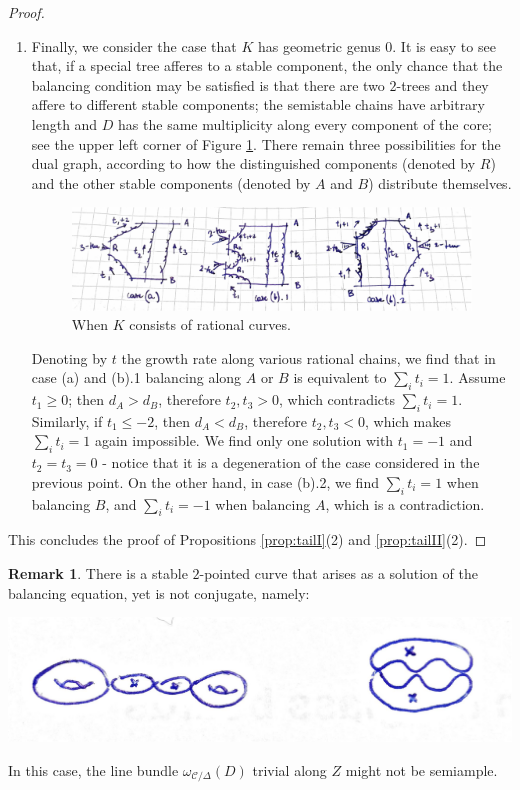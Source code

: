 \documentclass[11pt]{amsart}
\newcommand{\dvr}{\Delta}
\theoremstyle{plain}
\theoremstyle{definition}
\newtheorem{rem}[thm]{Remark}
\begin{document}
\begin{proof}
\begin{enumerate}[leftmargin=.6cm]
 \item Finally, we consider the case that $K$ has geometric genus $0$. It is easy to see that, if a special tree afferes to a stable component, the only chance that the balancing condition may be satisfied is that there are two $2$-trees and they affere to different stable components; the semistable chains have arbitrary length and $D$ has the same multiplicity along every component of the core; see the upper left corner of Figure \ref{fig:Krat}. There remain three possibilities for the dual graph, according to how the distinguished components (denoted by $R$) and the other stable components (denoted by $A$ and $B$) distribute themselves.
  \begin{figure}
 \includegraphics[width=.8\textwidth]{rational_pretzel} 
 \caption{When $K$ consists of rational curves.}\label{fig:Krat}
  \end{figure}
 Denoting by $t$ the growth rate along various rational chains, we find that in case (a) and (b).1 balancing along $A$ or $B$ is equivalent to $\sum_it_i=1$. Assume $t_1\geq0$; then $d_A>d_B$, therefore $t_2,t_3>0$, which contradicts $\sum_it_i=1$. Similarly, if $t_1\leq -2$, then $d_A<d_B$, therefore $t_2,t_3<0$, which makes $\sum_it_i=1$ again impossible. We find only one solution with $t_1=-1$ and $t_2=t_3=0$ - notice that it is a degeneration of the case considered in the previous point.
 On the other hand, in case (b).2, we find $\sum_it_i=1$ when balancing $B$, and $\sum_it_i=-1$ when balancing $A$, which is a contradiction.
\end{enumerate}
This concludes the proof of Propositions \ref{prop:tailI}(2) and \ref{prop:tailII}(2).
\end{proof}
\begin{rem}\label{rmk:extra_conjugate}
There is a stable $2$-pointed curve that arises as a solution of the balancing equation, yet is not conjugate, namely:
  \begin{center}
 \includegraphics[width=.6\textwidth]{extra_conjugate}  
  \end{center}
In this case, the line bundle $\omega_{\mathcal C/\dvr}(D)$ trivial along $Z$ might not be semiample.
\end{rem}
\end{document}
